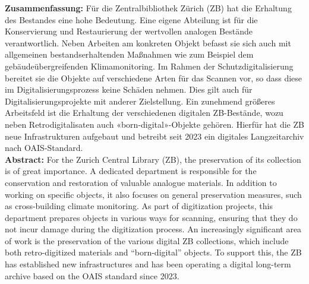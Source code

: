 \textbf{Zusammenfassung:} Für die Zentralbibliothek Zürich (ZB) hat die
Erhaltung des Bestandes eine hohe Bedeutung. Eine eigene Abteilung ist
für die Konservierung und Restaurierung der wertvollen analogen Bestände
verantwortlich. Neben Arbeiten am konkreten Objekt befasst sie sich auch
mit allgemeinen bestandserhaltenden Maßnahmen wie zum Beispiel dem
gebäudeübergreifenden Klimamonitoring. Im Rahmen der
Schutzdigitalisierung bereitet sie die Objekte auf verschiedene Arten
für das Scannen vor, so dass diese im Digitalisierungsprozess keine
Schäden nehmen. Dies gilt auch für Digitalisierungsprojekte mit anderer
Zielstellung. Ein zunehmend größeres Arbeitsfeld ist die Erhaltung der
verschiedenen digitalen ZB-Bestände, wozu neben Retrodigitalisaten auch
«born-digital»-Objekte gehören. Hierfür hat die ZB neue Infrastrukturen
aufgebaut und betreibt seit 2023 ein digitales Langzeitarchiv nach
OAIS-Standard.\\

\noindent
\textbf{Abstract:} For the Zurich Central Library (ZB), the preservation
of its collection is of great importance. A dedicated department is
responsible for the conservation and restoration of valuable analogue
materials. In addition to working on specific objects, it also focuses
on general preservation measures, such as cross-building climate
monitoring. As part of digitization projects, this department prepares
objects in various ways for scanning, ensuring that they do not incur
damage during the digitization process. An increasingly significant area
of work is the preservation of the various digital ZB collections, which
include both retro-digitized materials and \enquote{born-digital} objects. To
support this, the ZB has established new infrastructures and has been
operating a digital long-term archive based on the OAIS standard since
2023.
